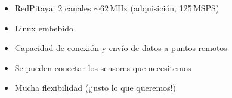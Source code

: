 \documentclass{beamer}
\begin{document}
\begin{frame}
												\footnotesize{				\begin{block}{}
																\begin{itemize} %
																				\item RedPitaya: 2 canales $\sim 62\,\text{MHz}$ (adquisición, 125\,MSPS)
																				\item \alert{Linux embebido}
																				\item Capacidad de conexión y envío de datos a puntos remotos
																				\item Se pueden conectar los sensores que necesitemos 
																				\item Mucha \alert{flexibilidad} (¡justo lo que queremos!)
																\end{itemize}
												\end{block}}
\end{frame} 

\end{document}
